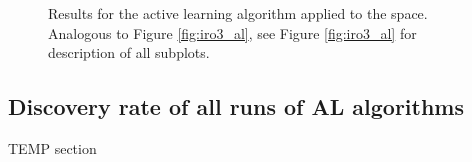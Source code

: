

\begin{figure}[!htb]
\centering
{}
\caption{\label{fig:iro2_al}
%
Results for the active learning algorithm applied to the \IrOtwo space.
%
Analogous to Figure \ref{fig:iro3_al}, see Figure \ref{fig:iro3_al} for description of all subplots.
}
\end{figure}


\subsection{Discovery rate of all runs of AL algorithms} %


%
%
TEMP section




